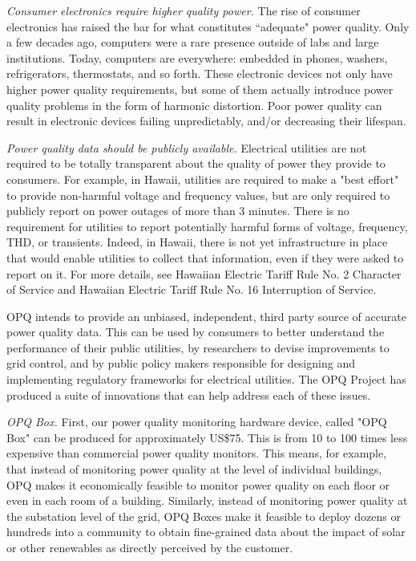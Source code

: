 {\em Consumer electronics require higher quality power.} The rise of consumer electronics has raised the bar for what constitutes ``adequate" power quality. Only a few decades ago, computers were a rare presence outside of labs and large institutions. Today, computers are everywhere: embedded in phones, washers, refrigerators, thermostats, and so forth. These electronic devices not only have higher power quality requirements, but some of them actually introduce power quality problems in the form of harmonic distortion. Poor power quality can result in electronic devices failing unpredictably, and/or decreasing their lifespan.

{\em Power quality data should be publicly available.} Electrical utilities are not required to be totally transparent about the quality of power they provide to consumers. For example, in Hawaii, utilities are required to make a "best effort" to provide non-harmful voltage and frequency values, but are only required to publicly report on power outages of more than 3 minutes. There is no requirement for utilities to report potentially harmful forms of voltage, frequency, THD, or transients. Indeed, in Hawaii, there is not yet infrastructure in place that would enable utilities to collect that information, even if they were asked to report on it. For more details, see Hawaiian Electric Tariff Rule No. 2 Character of Service and Hawaiian Electric Tariff Rule No. 16 Interruption of Service.

OPQ intends to provide an unbiased, independent, third party source of accurate power quality data. This can be used by consumers to better understand the performance of their public utilities, by researchers to devise improvements to grid control, and by public policy makers responsible for designing and implementing regulatory frameworks for electrical utilities.  The OPQ Project has produced a suite of innovations that can help address each of these issues.

{\em OPQ Box.} First, our power quality monitoring hardware device, called "OPQ Box" can be produced for approximately US\$75. This is from 10 to 100 times less expensive than commercial power quality monitors. This means, for example, that instead of monitoring power quality at the level of individual buildings, OPQ makes it economically feasible to monitor power quality on each floor or even in each room of a building. Similarly, instead of monitoring power quality at the substation level of the grid, OPQ Boxes make it feasible to deploy dozens or hundreds into a community to obtain fine-grained data about the impact of solar or other renewables as directly perceived by the customer.

